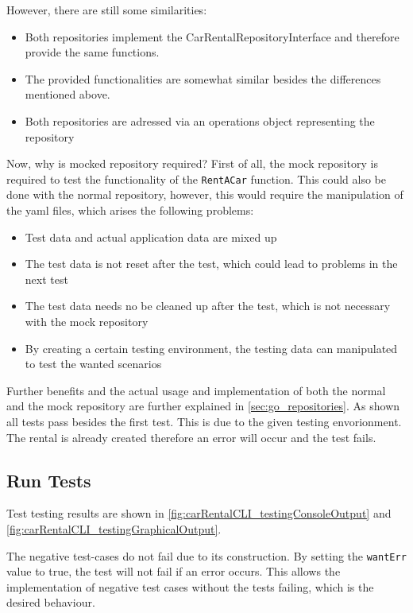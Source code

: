 However, there are still some similarities:
\begin{itemize}
      \item Both repositories implement the CarRentalRepositoryInterface and therefore provide the same functions.
      \item The provided functionalities are somewhat similar besides the differences mentioned above.
      \item Both repositories are adressed via an operations object representing the repository
\end{itemize}

Now, why is mocked repository required?
First of all, the mock repository is required to test the functionality of the \texttt{RentACar} function.
This could also be done with the normal repository, however, this would require the manipulation of the yaml files, which arises the following problems:
\begin{itemize}
      \item Test data and actual application data are mixed up
      \item The test data is not reset after the test, which could lead to problems in the next test
      \item The test data needs no be cleaned up after the test, which is not necessary with the mock repository
      \item By creating a certain testing environment, the testing data can manipulated to test the wanted scenarios
\end{itemize}

Further benefits and the actual usage and implementation of both the normal and the mock repository are further explained in \autoref{sec:go_repositories}.
As shown all tests pass besides the first test.
This is due to the given testing envorionment.
The rental is already created therefore an error will occur and the test fails.


\subsection*{Run Tests}
Test testing results are shown in \autoref{fig:carRentalCLI_testingConsoleOutput} and \autoref{fig:carRentalCLI_testingGraphicalOutput}.

The negative test-cases do not fail due to its construction.
By setting the \texttt{wantErr} value to true, the test will not fail if an error occurs.
This allows the implementation of negative test cases without the tests failing, which is the desired behaviour.

